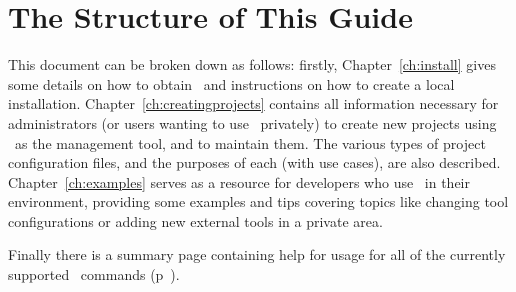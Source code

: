\section{The Structure of This Guide}

This document can be broken down as follows: firstly,
Chapter~\ref{ch:install} gives some details on how to obtain \scram\
and instructions on how to create a local installation.
Chapter~\ref{ch:creatingprojects} contains all information necessary for
administrators (or users wanting to use \scram\ privately) to
create new projects using \scram\ as the management tool, and to
maintain them. The various types of project configuration files, and
the purposes of each (with use cases), are also described.
Chapter~\ref{ch:examples} serves as a resource for developers who
use \scram\ in their environment, providing some examples and tips covering topics
like changing tool configurations or adding new external tools in a
private area.

\ni Finally there is a summary page containing help for usage for all of
the currently supported \scram\ commands (p~\pageref{ch:quickhelpguide}).

\newpage %


